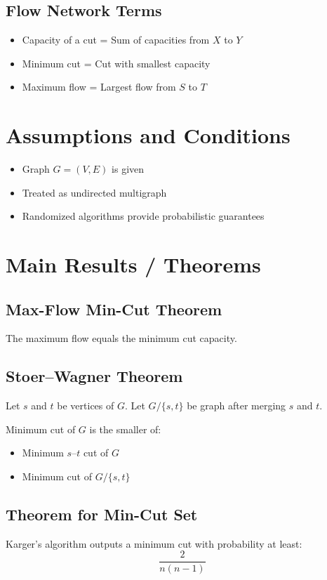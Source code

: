 \documentclass[12pt]{article}
\begin{document}
\subsection{Flow Network Terms}
\begin{itemize}
    \item Capacity of a cut = Sum of capacities from $X$ to $Y$
    \item Minimum cut = Cut with smallest capacity
    \item Maximum flow = Largest flow from $S$ to $T$
\end{itemize}

\section{Assumptions and Conditions}

\begin{itemize}
    \item Graph $G=(V,E)$ is given
    \item Treated as undirected multigraph
    \item Randomized algorithms provide probabilistic guarantees
\end{itemize}

\section{Main Results / Theorems}

\subsection{Max-Flow Min-Cut Theorem}
The maximum flow equals the minimum cut capacity.

\subsection{Stoer--Wagner Theorem}
Let $s$ and $t$ be vertices of $G$. Let $G/\{s,t\}$ be graph after merging $s$ and $t$.

Minimum cut of $G$ is the smaller of:
\begin{itemize}
    \item Minimum $s$--$t$ cut of $G$
    \item Minimum cut of $G/\{s,t\}$
\end{itemize}

\subsection{Theorem for Min-Cut Set}
Karger's algorithm outputs a minimum cut with probability at least:
\[
\frac{2}{n(n-1)}
\]
\end{document}
